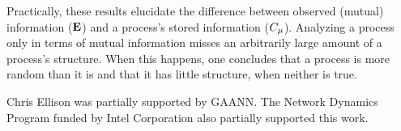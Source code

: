 \documentclass[prl,twocolumn,showpacs,superscriptaddress,preprintnumbers,floatfix]{revtex4}
\theoremstyle{plain}    \newtheorem{Lem}{Lemma}
\theoremstyle{plain}    \newtheorem*{ProLem}{Proof}
\theoremstyle{plain} 	\newtheorem{Cor}{Corollary}
\theoremstyle{plain} 	\newtheorem*{ProCor}{Proof}
\theoremstyle{plain} 	\newtheorem{The}{Theorem}
\theoremstyle{plain} 	\newtheorem*{ProThe}{Proof}
\theoremstyle{plain} 	\newtheorem{Prop}{Proposition}
\theoremstyle{plain} 	\newtheorem*{ProProp}{Proof}
\theoremstyle{plain} 	\newtheorem*{Conj}{Conjecture}
\theoremstyle{plain}	\newtheorem*{Rem}{Remark}
\theoremstyle{plain}	\newtheorem*{Def}{Definition}
\theoremstyle{plain}	\newtheorem*{Not}{Notation}
\begin{document}
Practically, these results elucidate the difference between observed (mutual) 
information (${\bf E}$) and a process's stored information (${C_\mu}$). Analyzing a 
process only in terms of mutual information misses an arbitrarily large 
amount of a process's structure. When this happens, one concludes that a 
process is more random than it is and that it has little structure, when 
neither is true.

Chris Ellison was partially supported by GAANN. The Network Dynamics Program
funded by Intel Corporation also partially supported this work.

\vspace{-0.21in}

\end{document}
